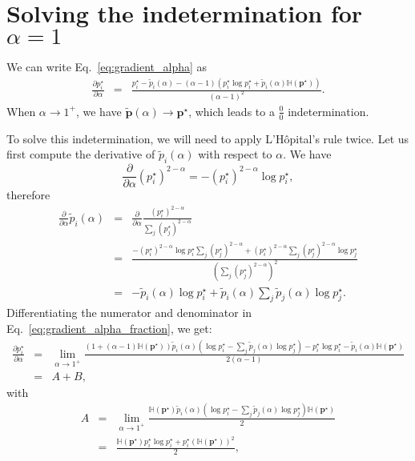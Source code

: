 \section*{Solving the indetermination for {\boldmath $\alpha=1$}}

We can write Eq.~\ref{eq:gradient_alpha} as
\begin{eqnarray}\label{eq:gradient_alpha_fraction}
    \frac{\partial p_i^{\star}}{\partial \alpha} &=&
    \frac{p_i^{\star} - \tilde{p}_i(\alpha) - (\alpha-1)(p_i^{\star}\log p_i^{\star} + \tilde{p}_i(\alpha)\mathbb H(\bm{p}^{\star}))}{(\alpha-1)^2}.
\end{eqnarray}
When $\alpha \rightarrow 1^+$, we have $\tilde{\bm{p}}(\alpha) \rightarrow \bm{p}^{\star}$, which leads to a $\frac{0}{0}$ indetermination.

To solve this indetermination, we will need to apply L'H\^opital's rule twice.
Let us first compute the derivative of $\tilde{p}_i(\alpha)$ with respect to $\alpha$. We have
\begin{equation}
    \frac{\partial}{\partial \alpha} (p_i^\star)^{2-\alpha} = -(p_i^{\star})^{2-\alpha} \log p_i^{\star},
\end{equation}
therefore
\begin{eqnarray}
    \frac{\partial}{\partial \alpha} \tilde{p}_i(\alpha) &=& \frac{\partial}{\partial \alpha} \frac{(p_i^\star)^{2-\alpha}}{\sum_j (p_j^\star)^{2-\alpha}}\nonumber\\
    &=& \frac{-(p_i^{\star})^{2-\alpha} \log p_i^{\star} \sum_j (p_j^\star)^{2-\alpha} + (p_i^{\star})^{2-\alpha} \sum_j (p_j^{\star})^{2-\alpha} \log p_j^{\star}}{\left( \sum_j (p_j^\star)^{2-\alpha} \right)^2}\nonumber\\
    &=& -\tilde{p}_i(\alpha)\log p_i^{\star} + \tilde{p}_i(\alpha) \sum_j \tilde{p}_j(\alpha) \log p_j^{\star}.
\end{eqnarray}
Differentiating the numerator and denominator in Eq.~\ref{eq:gradient_alpha_fraction}, we get:
\begin{eqnarray}\label{eq:gradient_alpha_shannon_01}
    \frac{\partial p_i^{\star}}{\partial \alpha} &=&
    \lim_{\alpha \rightarrow 1^+} \frac{(1 + (\alpha-1)\mathbb H(\bm{p}^{\star})) \tilde{p}_i(\alpha) (\log p_i^{\star} - \sum_j \tilde{p}_j(\alpha) \log p_j^{\star}) - p_i^{\star}\log p_i^{\star} - \tilde{p}_i(\alpha) \mathbb H(\bm{p}^{\star})}{2(\alpha-1)} \nonumber\\
    &=& A + B,
\end{eqnarray}
with
\begin{eqnarray}\label{eq:A_shannon}
    A &=& \lim_{\alpha \rightarrow 1^+} \frac{\mathbb H(\bm{p}^{\star}) \tilde{p}_i(\alpha) (\log p_i^{\star} - \sum_j \tilde{p}_j(\alpha) \log p_j^{\star}) \mathbb H(\bm{p}^{\star})}{2}\nonumber\\
    &=& \frac{\mathbb H(\bm{p}^{\star}) p_i^{\star}\log p_i^{\star} + p_i^{\star} (\mathbb H(\bm{p}^{\star}))^2}{2},
\end{eqnarray}
